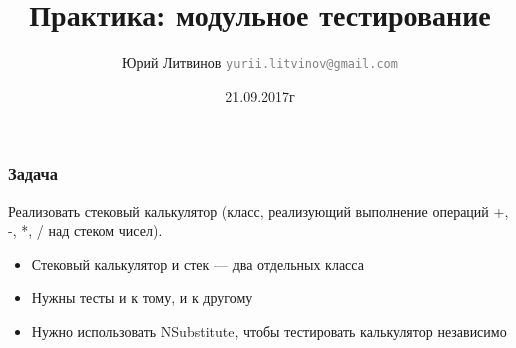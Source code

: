 \documentclass[xetex,mathserif,serif]{beamer}
\title{Практика: модульное тестирование}
\author[Юрий Литвинов]{Юрий Литвинов \newline \textcolor{gray}{\small\texttt{yurii.litvinov@gmail.com}}}
\date{21.09.2017г}
\begin{document}
	\frame{\titlepage}

	\begin{frame}
		\frametitle{Задача}
		Реализовать стековый калькулятор (класс, реализующий выполнение операций +, -, *, / над стеком чисел).
		\begin{itemize}
			\item Стековый калькулятор и стек --- два отдельных класса
			\item Нужны тесты и к тому, и к другому
			\item Нужно использовать NSubstitute, чтобы тестировать калькулятор независимо
		\end{itemize}
	\end{frame}
\end{document}
